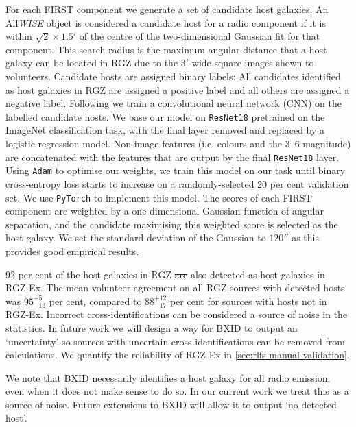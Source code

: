 \documentclass[11pt, a4paper]{book}
\providecommand{\DIFaddtex}[1]{{\protect\color{blue}\uwave{#1}}} %
\providecommand{\DIFdeltex}[1]{{\protect\color{red}\sout{#1}}}                      %
\providecommand{\DIFaddbegin}{} %
\providecommand{\DIFaddend}{} %
\providecommand{\DIFdelbegin}{} %
\providecommand{\DIFdelend}{} %
\providecommand{\DIFadd}[1]{\texorpdfstring{\DIFaddtex{#1}}{#1}} %
\providecommand{\DIFdel}[1]{\texorpdfstring{\DIFdeltex{#1}}{}} %
\newcommand{\DIFscaledelfig}{0.5}
\newlength{\DIFdelgraphicswidth} %
\newlength{\DIFdelgraphicsheight} %
\newcommand{\DIFaddincludegraphics}[2][]{{\color{blue}\fbox{\DIFOincludegraphics[#1]{#2}}}} %
\newcommand{\DIFdelincludegraphics}[2][]{%
\sbox{\DIFdelgraphicsbox}{\DIFOincludegraphics[#1]{#2}}%
\settoboxwidth{\DIFdelgraphicswidth}{\DIFdelgraphicsbox} %
\settoboxtotalheight{\DIFdelgraphicsheight}{\DIFdelgraphicsbox} %
\scalebox{\DIFscaledelfig}{%
\parbox[b]{\DIFdelgraphicswidth}{\usebox{\DIFdelgraphicsbox}\\[-\baselineskip] \rule{\DIFdelgraphicswidth}{0em}}\llap{\resizebox{\DIFdelgraphicswidth}{\DIFdelgraphicsheight}{%
\setlength{\unitlength}{\DIFdelgraphicswidth}%
\begin{picture}(1,1)%
\thicklines\linethickness{2pt} %
{\color[rgb]{1,0,0}\put(0,0){\framebox(1,1){}}}%
{\color[rgb]{1,0,0}\put(0,0){\line( 1,1){1}}}%
{\color[rgb]{1,0,0}\put(0,1){\line(1,-1){1}}}%
\end{picture}%
}\hspace*{3pt}}} %
} %
\DeclareRobustCommand{\DIFaddbegin}{\DIFOaddbegin \let\includegraphics\DIFaddincludegraphics} %
\DeclareRobustCommand{\DIFaddend}{\DIFOaddend \let\includegraphics\DIFOincludegraphics} %
\DeclareRobustCommand{\DIFdelbegin}{\DIFOdelbegin \let\includegraphics\DIFdelincludegraphics} %
\DeclareRobustCommand{\DIFdelend}{\DIFOaddend \let\includegraphics\DIFOincludegraphics} %
\begin{document}
For each FIRST component we generate a set of candidate host galaxies.
An All\emph{WISE} object is considered a candidate host for a radio
component if it is within $\sqrt{2} \times 1.5'$ of the centre of the two-dimensional
Gaussian fit for that component. This search radius is the maximum
angular distance that a host galaxy can be located in RGZ due to the
$3'$-wide square images shown to volunteers. Candidate hosts are
assigned binary labels: All candidates identified as host galaxies in
RGZ are assigned a positive label and all others are assigned a
negative label. Following \citet{alger18radio} we train a convolutional neural
network (CNN) on the labelled candidate hosts. We
base our model on \texttt{ResNet18} \citep{he2016resnet} pretrained on the
ImageNet classification task, with the final layer removed and replaced
by a logistic regression model. Non-image features (i.e. colours and the
\unit{3.6}{\micro\meter} magnitude) are concatenated with the features
that are output by the final \texttt{ResNet18} layer. Using \texttt{Adam}
\citep{kingma14adam} to optimise our weights, we train this model on our
task until binary cross-entropy loss starts to increase on a
randomly-selected 20 per cent validation set. We use \texttt{PyTorch}
\citep{paszke2017pytorch} to implement this model. The scores of each FIRST
component are weighted by a one-dimensional Gaussian function of angular separation, and the
candidate maximising this weighted score is selected as the host galaxy. We
set the standard deviation of the Gaussian to $120''$ as this provides good
empirical results.

92 per cent of the host galaxies in RGZ \DIFdelbegin \DIFdel{are }\DIFdelend \DIFaddbegin \DIFadd{were }\DIFaddend also detected as host galaxies in RGZ-Ex. The mean volunteer agreement on all RGZ sources with detected hosts was $95^{+5}_{-13}$ per cent, compared to $88^{+12}_{-17}$ per cent for sources with hosts not in RGZ-Ex. Incorrect cross-identifications can be considered a source of noise in the statistics. In future work we will design a way for BXID to output an `uncertainty' so \DIFaddbegin \DIFadd{that }\DIFaddend sources with uncertain cross-identifications can be removed from calculations. We quantify the reliability of RGZ-Ex in \autoref{sec:rlfs-manual-validation}.

We note that BXID necessarily identifies a host galaxy for all radio emission, even when it does not
make sense to do so. In our current work we treat this as a source of
noise. Future extensions to BXID will allow it to output `no detected
host'.
\end{document}
